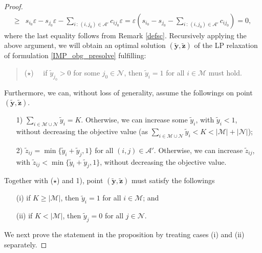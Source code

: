 \documentclass[a4paper,10pt]{article}
\theoremstyle{plain}
\newcommand{\revv}[1]{{#1}}
\begin{document}
\begin{proof}
\begin{equation*}
\begin{aligned}
				\geq&  s_{i_0} \varepsilon -s_{j_0}  \varepsilon  - \sum_{i\,:\,(i,j_0)\in \mathcal{A}'} c_{ij_0}\varepsilon=  \varepsilon \left (s_{i_0} -  s_{j_0} - \sum_{i\,:\,(i,j_0)\in \mathcal{A}'} c_{ij_0}\right) =0,
			\end{aligned}
		\end{equation*}
		where the last equality follows from Remark \ref{defsc}.
		Recursively applying the above argument, we will obtain an optimal solution $(\tilde{\boldsymbol{y}},\tilde{\boldsymbol{z}})$ of the LP relaxation of formulation \eqref{IMP_obg_presolve} fulfilling:
		\begin{quote} 
			($\star$) ~~if $\tilde{y}_{j_0}> 0$ for some $ j_0 \in \mathcal{N}$, then $\tilde{y}_i = 1$ for all $i \in \mathcal{M}$ must hold.
		\end{quote}
		Furthermore, we can, without loss of generality, assume the followings on point $(\tilde{\boldsymbol{y}},\tilde{\boldsymbol{z}})$.
		\begin{itemize}
			\item [1)] $\sum_{i \in \mathcal{M}\cup \mathcal{N}} \tilde{y}_i = K $. Otherwise,  we can increase \revv{some} $\tilde{y}_i$, with $\tilde{y}_i < 1$, without decreasing the objective value (as $\sum_{i \in \mathcal{M}\cup \mathcal{N}} \tilde{y}_i  < K < |\mathcal{M}|+|\mathcal{N}|$);
			\item [2)] $\tilde{z}_{ij} =  \min\{ \tilde{y}_i + \tilde{y}_j, 1 \} $ for all $(i,j)\in \mathcal{A}'$. Otherwise, we can increase $\tilde{z}_{ij}$, with $\tilde{z}_{ij} < \min\{ \tilde{y}_i + \tilde{y}_j, 1 \} $, without decreasing the objective value.  
		\end{itemize}
		Together with ($\star$) and 1),  point $(\tilde{\boldsymbol{y}}, \tilde{\boldsymbol{z}})$ must satisfy the followings
		\begin{itemize}
			\item [(i)] if $K \geq  |\mathcal{M}|$, then $\tilde{y}_i = 1$ for all $i \in \mathcal{M}$; and 
			\item [(ii)] if $K < |\mathcal{M}|$, then $\tilde{y}_j = 0$ for all $j \in \mathcal{N}$.
		\end{itemize}
		We next prove the statement in the proposition  by treating cases (i) and (ii) separately.
		

\end{proof}
\end{document}
